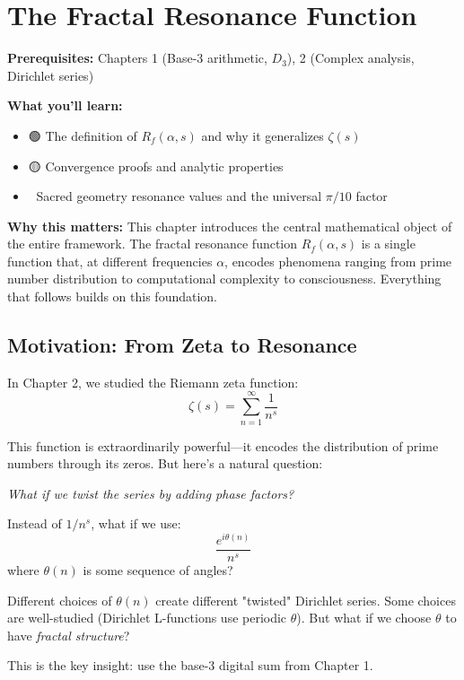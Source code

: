 \chapter{The Fractal Resonance Function}
\label{ch:resonance}

\begin{chapterobjectives}
\textbf{Prerequisites:} Chapters 1 (Base-3 arithmetic, $D_3$), 2 (Complex analysis, Dirichlet series)

\textbf{What you'll learn:}
\begin{itemize}
\item 🟢 The definition of $R_f(\alpha, s)$ and why it generalizes $\zeta(s)$
\item 🟡 Convergence proofs and analytic properties
\item 🔴 Sacred geometry resonance values and the universal $\pi/10$ factor
\end{itemize}

\textbf{Why this matters:} This chapter introduces the central mathematical object of the entire framework. The fractal resonance function $R_f(\alpha, s)$ is a single function that, at different frequencies $\alpha$, encodes phenomena ranging from prime number distribution to computational complexity to consciousness. Everything that follows builds on this foundation.
\end{chapterobjectives}

\section{Motivation: From Zeta to Resonance}
\label{sec:motivation}


\begin{intuitive}
In Chapter 2, we studied the Riemann zeta function:
\begin{equation}
\zeta(s) = \sum_{n=1}^{\infty} \frac{1}{n^s}
\end{equation}

This function is extraordinarily powerful—it encodes the distribution of prime numbers through its zeros. But here's a natural question:

\textit{What if we twist the series by adding phase factors?}

Instead of $1/n^s$, what if we use:
\begin{equation}
\frac{e^{i\theta(n)}}{n^s}
\end{equation}
where $\theta(n)$ is some sequence of angles?

Different choices of $\theta(n)$ create different "twisted" Dirichlet series. Some choices are well-studied (Dirichlet L-functions use periodic $\theta$). But what if we choose $\theta$ to have \textit{fractal structure}?

This is the key insight: use the base-3 digital sum from Chapter 1.
\end{intuitive}

